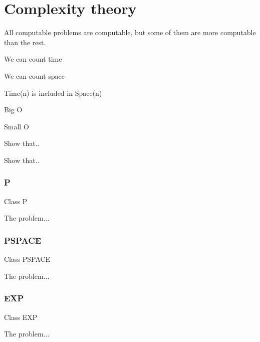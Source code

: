 
\chapter{Complexity theory}

\begin{remark}
All computable problems are computable,
but some of them are more computable than the rest.
\end{remark}
We can count time

We can count space

Time(n) is included in Space(n)
\begin{definition}
Big O
\end{definition}
\begin{definition}
Small O
\end{definition}
\begin{exercise}
Show that..
\end{exercise}
\begin{exercise}
Show that..
\end{exercise}
\subsection{P}
\begin{definition}
Class P
\end{definition}
\begin{example}
The problem...
\end{example}
\subsection{PSPACE}
\begin{definition}
Class PSPACE
\end{definition}
\begin{example}
The problem...
\end{example}
\subsection{EXP}
\begin{definition}
Class EXP
\end{definition}
\begin{example}
The problem...
\end{example}
